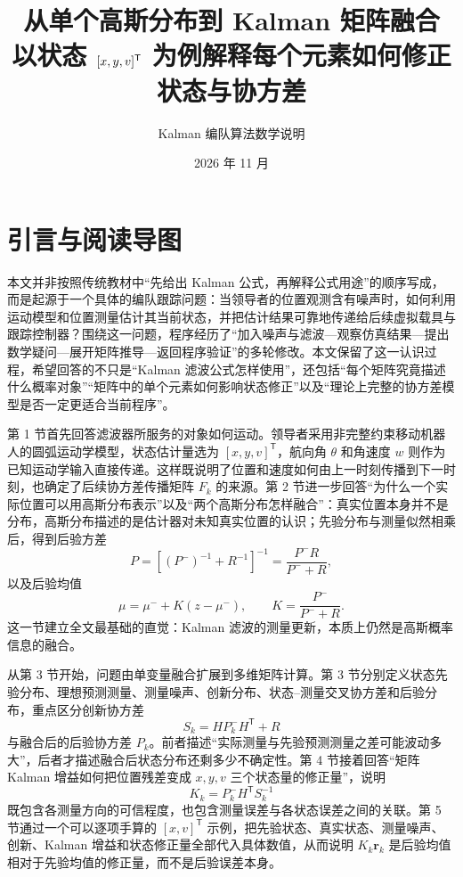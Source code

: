 \documentclass[UTF8,a4paper,11pt]{ctexart}
\title{从单个高斯分布到 Kalman 矩阵融合\\
\large 以状态 $[x,y,v]\transpose$ 为例解释每个元素如何修正状态与协方差}
\author{Kalman 编队算法数学说明}
\date{2026 年 11 月}
\newcommand{\prior}{^{-}}
\newcommand{\transpose}{^{\mathsf T}}
\begin{document}
\maketitle
\tableofcontents
\newpage

\section*{引言与阅读导图}

本文并非按照传统教材中“先给出 Kalman 公式，再解释公式用途”的顺序写成，而是起源于一个具体的编队跟踪问题：当领导者的位置观测含有噪声时，如何利用运动模型和位置测量估计其当前状态，并把估计结果可靠地传递给后续虚拟载具与跟踪控制器？围绕这一问题，程序经历了“加入噪声与滤波---观察仿真结果---提出数学疑问---展开矩阵推导---返回程序验证”的多轮修改。本文保留了这一认识过程，希望回答的不只是“Kalman 滤波公式怎样使用”，还包括“每个矩阵究竟描述什么概率对象”“矩阵中的单个元素如何影响状态修正”以及“理论上完整的协方差模型是否一定更适合当前程序”。

第 1 节首先回答滤波器所服务的对象如何运动。领导者采用非完整约束移动机器人的圆弧运动学模型，状态估计量选为 $[x,y,v]^{\mathsf T}$，航向角 $\theta$ 和角速度 $w$ 则作为已知运动学输入直接传递。这样既说明了位置和速度如何由上一时刻传播到下一时刻，也确定了后续协方差传播矩阵 $F_k$ 的来源。第 2 节进一步回答“为什么一个实际位置可以用高斯分布表示”以及“两个高斯分布怎样融合”：真实位置本身并不是分布，高斯分布描述的是估计器对未知真实位置的认识；先验分布与测量似然相乘后，得到后验方差
\begin{equation}
P=\left[(P\prior)^{-1}+R^{-1}\right]^{-1}
=\frac{P\prior R}{P\prior+R},
\end{equation}
以及后验均值
\begin{equation}
\mu=\mu\prior+K(z-\mu\prior),
\qquad
K=\frac{P\prior}{P\prior+R}.
\end{equation}
这一节建立全文最基础的直觉：Kalman 滤波的测量更新，本质上仍然是高斯概率信息的融合。

从第 3 节开始，问题由单变量融合扩展到多维矩阵计算。第 3 节分别定义状态先验分布、理想预测测量、测量噪声、创新分布、状态--测量交叉协方差和后验分布，重点区分创新协方差
\begin{equation}
S_k=HP_k\prior H\transpose+R
\end{equation}
与融合后的后验协方差 $P_k$。前者描述“实际测量与先验预测测量之差可能波动多大”，后者才描述融合后状态分布还剩多少不确定性。第 4 节接着回答“矩阵 Kalman 增益如何把位置残差变成 $x,y,v$ 三个状态量的修正量”，说明
\begin{equation}
K_k=P_k\prior H\transpose S_k^{-1}
\end{equation}
既包含各测量方向的可信程度，也包含测量误差与各状态误差之间的关联。第 5 节通过一个可以逐项手算的 $[x,v]^{\mathsf T}$ 示例，把先验状态、真实状态、测量噪声、创新、Kalman 增益和状态修正量全部代入具体数值，从而说明 $K_k\bm r_k$ 是后验均值相对于先验均值的修正量，而不是后验误差本身。
\end{document}
